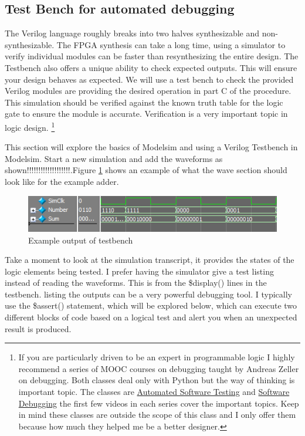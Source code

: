     \subsection{Test Bench for automated debugging}
      The Verilog language roughly breaks into two halves synthesizable and non-synthesizable. The FPGA synthesis can take a long time, using a simulator to verify individual modules can be faster than resynthesizing the entire design. The Testbench also offers a unique ability to check expected outputs. This will ensure your design behaves as expected. We will use a test bench to check the provided Verilog modules are providing the desired operation in part C of the procedure. This simulation should be verified against the known truth table for the logic gate to ensure the module is accurate. Verification is a very important topic in logic design. \footnote{If you are particularly driven to be an expert in programmable logic I highly recommend a series of MOOC courses on debugging taught by Andreas Zeller on debugging. Both classes deal only with Python but the way of thinking is important topic. The classes are \href{https://www.udacity.com/course/cs258}{Automated Software Testing} and \href{https://www.udacity.com/course/cs259}{Software Debugging} the first few videos in each series cover the important topics. Keep in mind these classes are outside the scope of this class and I only offer them because how much they helped me be a better designer.}

      

      This section will explore the basics of Modelsim and using a Verilog Testbench in Modelsim. Start a new simulation and add the waveforms as shown!!!!!!!!!!!!!!!!!!!.Figure \ref{LogicOut} shows an example of what the wave section should look like for the example adder. 
      \begin{figure}[H]
        \includegraphics[width=.48\textwidth]{Images/LogicOutput.png}
        \caption{Example output of testbench}
        \label{LogicOut}
      \end{figure}

      Take a moment to look at the simulation transcript, it provides the states of the logic elements being tested. I prefer having the simulator give a test listing instead of reading the waveforms. This is from the \$display()
      lines in the testbench. listing the outputs can be a very powerful debugging tool. I typically use the \$assert()
      statement, which will be explored below, which can execute two different blocks of code based on a logical test and alert you when an unexpected result is produced.
      

